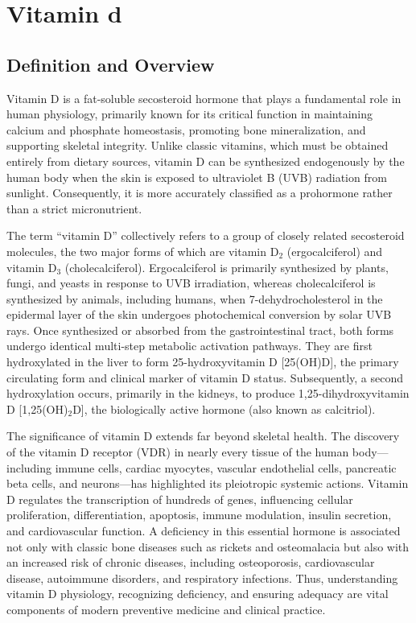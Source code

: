 \chapter{Vitamin d}

\section*{Definition and Overview}
Vitamin D is a fat-soluble secosteroid hormone that plays a fundamental role in human physiology, primarily known for its critical function in maintaining calcium and phosphate homeostasis, promoting bone mineralization, and supporting skeletal integrity. Unlike classic vitamins, which must be obtained entirely from dietary sources, vitamin D can be synthesized endogenously by the human body when the skin is exposed to ultraviolet B (UVB) radiation from sunlight. Consequently, it is more accurately classified as a prohormone rather than a strict micronutrient.

The term ``vitamin D'' collectively refers to a group of closely related secosteroid molecules, the two major forms of which are vitamin D$_{2}$ (ergocalciferol) and vitamin D$_{3}$ (cholecalciferol). Ergocalciferol is primarily synthesized by plants, fungi, and yeasts in response to UVB irradiation, whereas cholecalciferol is synthesized by animals, including humans, when 7-dehydrocholesterol in the epidermal layer of the skin undergoes photochemical conversion by solar UVB rays. Once synthesized or absorbed from the gastrointestinal tract, both forms undergo identical multi-step metabolic activation pathways. They are first hydroxylated in the liver to form 25-hydroxyvitamin D [25(OH)D], the primary circulating form and clinical marker of vitamin D status. Subsequently, a second hydroxylation occurs, primarily in the kidneys, to produce 1,25-dihydroxyvitamin D [1,25(OH)$_{2}$D], the biologically active hormone (also known as calcitriol).

The significance of vitamin D extends far beyond skeletal health. The discovery of the vitamin D receptor (VDR) in nearly every tissue of the human body---including immune cells, cardiac myocytes, vascular endothelial cells, pancreatic beta cells, and neurons---has highlighted its pleiotropic systemic actions. Vitamin D regulates the transcription of hundreds of genes, influencing cellular proliferation, differentiation, apoptosis, immune modulation, insulin secretion, and cardiovascular function. A deficiency in this essential hormone is associated not only with classic bone diseases such as rickets and osteomalacia but also with an increased risk of chronic diseases, including osteoporosis, cardiovascular disease, autoimmune disorders, and respiratory infections. Thus, understanding vitamin D physiology, recognizing deficiency, and ensuring adequacy are vital components of modern preventive medicine and clinical practice.

